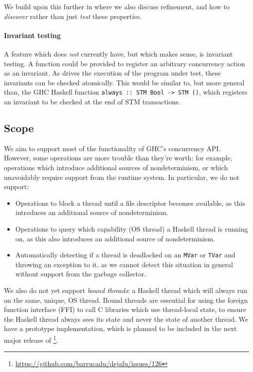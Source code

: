 We build upon this further in  where we also discuss
refinement, and how to \emph{discover} rather than just \emph{test}
these properties.

\paragraph{Invariant testing}
A feature which \dejafu{} does \emph{not} currently have, but which
makes sense, is invariant testing.  A function could be provided to
register an arbitrary concurrency action as an invariant.  As
\dejafu{} drives the execution of the program under test, these
invariants can be checked atomically.  This would be similar to, but
more general than, the GHC Haskell function
\verb|always :: STM Bool -> STM ()|, which registers an invariant to
be checked at the end of STM transactions.

\subsection{Scope}
\label{sec:dejafu-whatis-scope}

We aim to support most of the functionality of GHC’s concurrency API.
However, some operations are more trouble than they're worth: for
example, operations which introduce additional sources of
nondeterminism, or which unavoidably require support from the runtime
system.  In particular, we do not support:

\begin{itemize}
\item Operations to block a thread until a file descriptor becomes
  available, as this introduces an additional source of
  nondeterminism.

\item Operations to query which capability (OS thread) a Haskell
  thread is running on, as this also introduces an additional source
  of nondeterminism.

\item Automatically detecting if a thread is deadlocked on an
  \verb|MVar| or \verb|TVar| and throwing an exception to it, as we
  cannot detect this situation in general without support from the
  garbage collector.
\end{itemize}

We also do not yet support \emph{bound threads}: a Haskell thread
which will always run on the same, unique, OS thread.  Bound threads
are essential for using the foreign function interface (FFI) to call C
libraries which use thread-local state, to ensure the Haskell thread
always sees its state and never the state of another thread.  We have
a prototype implementation, which is planned to be included in the
next major release of
\dejafu{}\footnote{\url{https://github.com/barrucadu/dejafu/issues/126}}.

